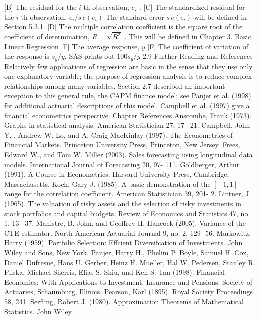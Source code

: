 \documentclass[11pt]{article}
\begin{document}
[B] The residual for the \(i\) th observation, \(e_{i}\) .
[C] The standardized residual for the \(i\) th observation, \(e_{i} / s \, e ( e_{i} )\) The standard
error \(s \, e ( e_{i} )\) will be defined in Section 5.3.1.
[D] The multiple correlation coefficient is the square root of the coefficient of
 determination, \(R=\sqrt{R^{2}}\) . This will be defined in Chapter 3.
 Basic Linear Regression
[E] The average response, \(\overline{{y}}\)
[F] The coefficient of variation of the response is \(s_{y} / \overline{{y}} .\) SAS prints out \(1 0 0 s_{y} / \overline{{y}}\)
2.9 Further Reading and References
Relatively few applications of regression are basic in the sense that they use
only one explanatory variable; the purpose of regression analysis is to reduce
 complex relationships among many variables. Section 2.7 described an important
exception to this general rule, the CAPM finance model; see Panjer et al. (1998)
for additional actuarial descriptions of this model. Campbell et al. (1997) give a
financial econometrics perspective.
 Chapter References
Anscombe, Frank (1973). Graphs in statistical analysis. American Statistician 27, 17-- 21.
Campbell, John \(\mathrm{Y .}\) , Andrew W. Lo, and A. Craig MacKinlay (1997). The Econometrics of
Financial Markets. Princeton University Press, Princeton, New Jersey.
 Frees, Edward W., and Tom W. Miller (2003). Sales forecasting using longitudinal data models.
International Journal of Forecasting 20, 97- 111.
Goldberger, Arthur (1991). A Course in Econometrics. Harvard University Press, Cambridge,
Massachusetts.
 Koch, Gary J. (1985). A basic demonstration of the \([-1 , 1 ]\) range for the correlation coefficient.
American Statistician 39, 201- 2.
Lintner, J. (1965). The valuation of risky assets and the selection of risky investments in stock
 portfolios and capital budgets. Review of Economics and Statistics 47, no. 1, 13-- 37.
Manistre, B. John, and Geoffrey H. Hancock (2005). Variance of the CTE estimator. North
American Actuarial Journal 9, no. 2, 129- 56.
Markowitz, Harry (1959). Portfolio Selection: Effcient Diversifcation of Investments. John
Wiley and Sons, New York.
Panjer, Harry H., Phelim P. Boyle, Samuel H. Cox, Daniel Dufresne, Hans U. Gerber, Heinz H.
 Mueller, Hal W. Pedersen, Stanley R. Pliska, Michael Sherris, Elias S. Shiu, and Ken S. Tan
(1998). Financial Economics: With Applications to Investment, Insurance and Pensions.
Society of Actuaries, Schaumburg, Illinois.
Pearson, Karl (1895). Royal Society Proceedings 58, 241.
 Serfling, Robert J. (1980). Approximation Theorems of Mathematical Statistics. John Wiley
\end{document}
